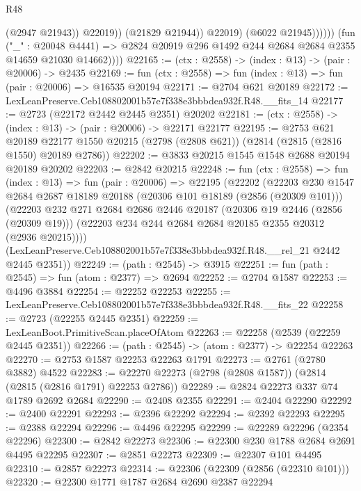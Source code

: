 \begin{lexlean}{R48}
\begin{coremodule}
                              (@2947 @21943))
                            @22019))
                        (@21829 @21944))
                      @22019)
                    (@6022 @21945))))))
          (fun ("_" : @20048 @4441) =>
          @2824 @20919 @296 @1492 @244 @2684 @2684 @2355 @14659 @21030 @14662))))
@22165 := (ctx : @2558) -> (index : @13) -> (pair : @20006) -> @2435
@22169 := fun (ctx : @2558) => fun (index : @13) => fun (pair : @20006) => @16535 @20194
@22171 := @2704 @621 @20189
@22172 := LexLeanPreserve.Ceb108802001b57e7f338e3bbbdea932f.R48.__fits_14
@22177 := @2723 (@22172 @2442 @2445 @2351) @20202
@22181 := (ctx : @2558) -> (index : @13) -> (pair : @20006) -> @22171 @22177
@22195 := @2753
    @621
    @20189
    @22177
    @1550
    @20215
    (@2798 (@2808 @621))
    (@2814 (@2815 (@2816 @1550) @20189 @2786))
@22202 := @3833 @20215 @1545 @1548 @2688 @20194 @20189 @20202
@22203 := @2842 @20215
@22248 := fun (ctx : @2558) =>
  fun (index : @13) =>
  fun (pair : @20006) =>
  @22195
    (@22202
      (@22203
        @230
        @1547
        @2684
        @2687
        @18189
        @20188
        (@20306 @101 @18189 (@2856 (@20309 @101)))
        (@22203
          @232
          @271
          @2684
          @2686
          @2446
          @20187
          (@20306 @19 @2446 (@2856 (@20309 @19)))
          (@22203 @234 @244 @2684 @2684 @20185 @2355 @20312 (@2936 @20215))))
      (LexLeanPreserve.Ceb108802001b57e7f338e3bbbdea932f.R48.__rel_21 @2442 @2445 @2351))
@22249 := (path : @2545) -> @3915
@22251 := fun (path : @2545) => fun (atom : @2377) => @2694
@22252 := @2704 @1587
@22253 := @4496 @3884
@22254 := @22252 @22253
@22255 := LexLeanPreserve.Ceb108802001b57e7f338e3bbbdea932f.R48.__fits_22
@22258 := @2723 (@22255 @2445 @2351)
@22259 := LexLeanBoot.PrimitiveScan.placeOfAtom
@22263 := @22258 (@2539 (@22259 @2445 @2351))
@22266 := (path : @2545) -> (atom : @2377) -> @22254 @22263
@22270 := @2753 @1587 @22253 @22263 @1791
@22273 := @2761 (@2780 @3882) @4522
@22283 := @22270 @22273 (@2798 (@2808 @1587)) (@2814 (@2815 (@2816 @1791) @22253 @2786))
@22289 := @2824 @22273 @337 @74 @1789 @2692 @2684
@22290 := @2408 @2355
@22291 := @2404 @22290
@22292 := @2400 @22291
@22293 := @2396 @22292
@22294 := @2392 @22293
@22295 := @2388 @22294
@22296 := @4496 @22295
@22299 := @22289 @22296 (@2354 @22296)
@22300 := @2842 @22273
@22306 := @22300 @230 @1788 @2684 @2691 @4495 @22295
@22307 := @2851 @22273
@22309 := @22307 @101 @4495
@22310 := @2857 @22273
@22314 := @22306 (@22309 (@2856 (@22310 @101)))
@22320 := @22300 @1771 @1787 @2684 @2690 @2387 @22294

\end{coremodule}
\end{lexlean}
